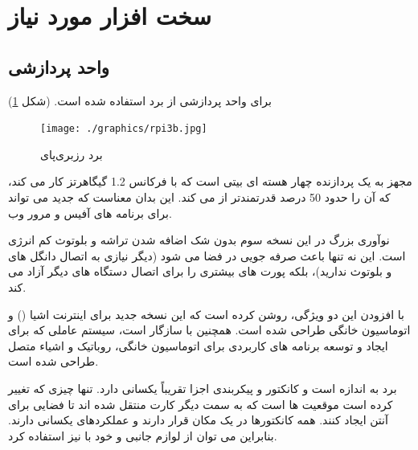 \documentclass{article}
\begin{document}
\section{سخت افزار مورد نیاز}
\subsection{واحد پردازشی}
برای واحد پردازشی از برد  استفاده شده است. \cite{pi} (شکل \ref{RPi3})
 
\begin{figure}
	\centering
	\texttt{[image: ./graphics/rpi3b.jpg]}
	\caption{برد رزبری‌پای}
	\label{RPi3}
\end{figure}

 مجهز به یک پردازنده چهار هسته ای  بیتی  است که با فرکانس 1.2 گیگاهرتز کار می کند، که آن را حدود 50 درصد قدرتمندتر از  می کند. این بدان معناست که  جدید می تواند برای برنامه های آفیس و مرور وب.

نوآوری بزرگ در این نسخه سوم بدون شک اضافه شدن تراشه  و بلوتوث کم انرژی است. این نه تنها باعث صرفه جویی در فضا می شود (دیگر نیازی به اتصال دانگل های  و بلوتوث ندارید)، بلکه پورت های  بیشتری را برای اتصال دستگاه های دیگر آزاد می کند.

با افزودن این دو ویژگی،  روشن کرده است که این نسخه جدید برای اینترنت اشیا () و اتوماسیون خانگی طراحی شده است.  همچنین با سازگار است، سیستم عاملی که برای ایجاد و توسعه برنامه های کاربردی برای اتوماسیون خانگی، روباتیک و اشیاء متصل طراحی شده است.

برد  به اندازه  است و کانکتور و پیکربندی اجزا تقریباً یکسانی دارد. تنها چیزی که تغییر کرده است موقعیت  ها است که به سمت دیگر کارت  منتقل شده اند تا فضایی برای آنتن  ایجاد کنند. همه کانکتورها در یک مکان قرار دارند و عملکردهای یکسانی دارند. بنابراین می توان از لوازم جانبی  و  خود با  نیز استفاده کرد.
\end{document}
